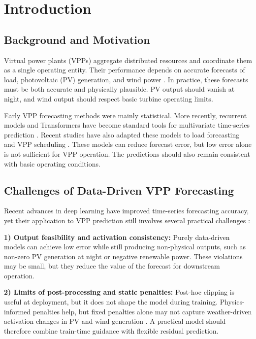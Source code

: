 \section{Introduction}

\subsection{Background and Motivation}
Virtual power plants (VPPs) aggregate distributed resources and coordinate them as a single operating entity. Their performance depends on accurate forecasts of load, photovoltaic (PV) generation, and wind power \cite{Ma2025,Cao2023,Qiu2024,Moreno2020,Wu2024}. In practice, these forecasts must be both accurate and physically plausible. PV output should vanish at night, and wind output should respect basic turbine operating limits.

Early VPP forecasting methods were mainly statistical. More recently, recurrent models and Transformers have become standard tools for multivariate time-series prediction \cite{Zhou2021informer,Wu2021autoformer,Nie2023patchtst,Zeng2023}. Recent studies have also adapted these models to load forecasting and VPP scheduling \cite{Qiu2024,Ashraf2025,Du2025,Li2025MetaInformer}. These models can reduce forecast error, but low error alone is not sufficient for VPP operation. The predictions should also remain consistent with basic operating conditions.

\subsection{Challenges of Data-Driven VPP Forecasting}
Recent advances in deep learning have improved time-series forecasting accuracy, yet their application to VPP prediction still involves several practical challenges \cite{Vle2025,Arabzadeh2025}:

\textbf{1) Output feasibility and activation consistency:} Purely data-driven models can achieve low error while still producing non-physical outputs, such as non-zero PV generation at night or negative renewable power. These violations may be small, but they reduce the value of the forecast for downstream operation.

\textbf{2) Limits of post-processing and static penalties:} Post-hoc clipping is useful at deployment, but it does not shape the model during training. Physics-informed penalties help, but fixed penalties alone may not capture weather-driven activation changes in PV and wind generation \cite{Raissi2019,Li2026,Asinyo2025}. A practical model should therefore combine train-time guidance with flexible residual prediction.

